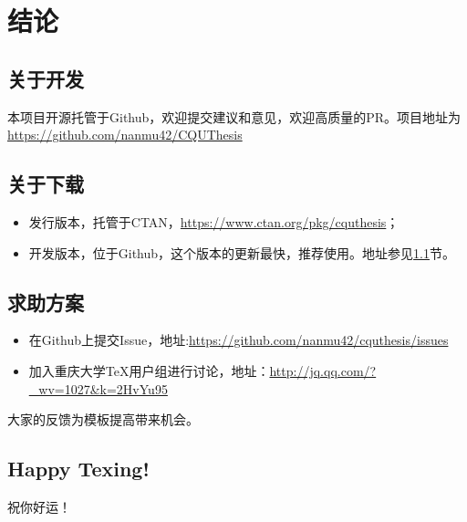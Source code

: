 \chapter{结论}
\section{关于开发}\label{sec:dev}
本项目开源托管于Github，欢迎提交建议和意见，欢迎高质量的PR。项目地址为\url{https://github.com/nanmu42/CQUThesis}
\section{关于下载}
\begin{itemize}
	\item 发行版本，托管于CTAN，\url{https://www.ctan.org/pkg/cquthesis}；
	\item 开发版本，位于Github，这个版本的更新最快，推荐使用。地址参见\ref{sec:dev}节。
\end{itemize}
\section{求助方案}
\begin{itemize}
	\item 在Github上提交Issue，地址:\url{https://github.com/nanmu42/cquthesis/issues}
	\item 加入重庆大学\TeX 用户组进行讨论，地址：\url{http://jq.qq.com/?_wv=1027&k=2HvYu95}
\end{itemize}
 
大家的反馈为模板提高带来机会。
\section{Happy Texing!}
祝你好运！
